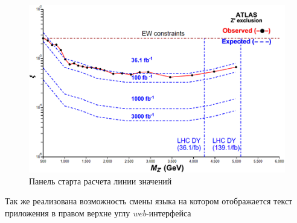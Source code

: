 \begin{figure}[!h]
	\centering
	\includegraphics[width=\textwidth]{figures/graph-result.png}
	\caption{Панель старта расчета линии значений}
	\label{fig:graph-result}
\end{figure}

Так же реализована возможность смены языка на котором отображается текст приложения в правом верхне углу \textit{web}-интерфейса


